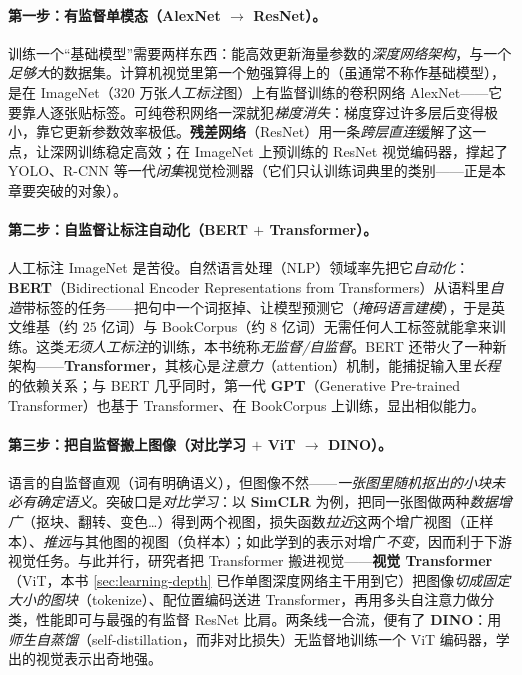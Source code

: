 \paragraph{第一步：有监督单模态（AlexNet $\to$ ResNet）。}
训练一个“基础模型”需要两样东西：能高效更新海量参数的\emph{深度网络架构}，与一个\emph{足够大}的数据集。计算机视觉里第一个勉强算得上的（虽通常不称作基础模型），是在 ImageNet（$320$ 万张\emph{人工标注}图）上有监督训练的卷积网络 AlexNet——它要靠人逐张贴标签。可纯卷积网络一深就犯\emph{梯度消失}：梯度穿过许多层后变得极小，靠它更新参数效率极低。\textbf{残差网络}（ResNet）\cite{he2016resnet}用一条\emph{跨层直连}缓解了这一点，让深网训练稳定高效；在 ImageNet 上预训练的 ResNet 视觉编码器，撑起了 YOLO、R-CNN 等一代\emph{闭集}视觉检测器（它们只认训练词典里的类别——正是本章要突破的对象）。

\paragraph{第二步：自监督让标注自动化（BERT $+$ Transformer）。}
人工标注 ImageNet 是苦役。自然语言处理（NLP）领域率先把它\emph{自动化}：\textbf{BERT}（Bidirectional Encoder Representations from Transformers）从语料里\emph{自造}带标签的任务——把句中一个词抠掉、让模型预测它（\emph{掩码语言建模}），于是英文维基（约 $25$ 亿词）与 BookCorpus（约 $8$ 亿词）无需任何人工标签就能拿来训练。这类\emph{无须人工标注}的训练，本书统称\emph{无监督/自监督}。BERT 还带火了一种新架构——\textbf{Transformer}，其核心是\emph{注意力}（attention）机制，能捕捉输入里\emph{长程}的依赖关系；与 BERT 几乎同时，第一代 \textbf{GPT}（Generative Pre-trained Transformer）也基于 Transformer、在 BookCorpus 上训练，显出相似能力。

\paragraph{第三步：把自监督搬上图像（对比学习 $+$ ViT $\to$ DINO）。}
语言的自监督直观（词有明确语义），但图像不然——\emph{一张图里随机抠出的小块未必有确定语义}。突破口是\emph{对比学习}：以 \textbf{SimCLR} 为例，把同一张图做两种\emph{数据增广}（抠块、翻转、变色\dots）得到两个视图，损失函数\emph{拉近}这两个增广视图（正样本）、\emph{推远}与其他图的视图（负样本）；如此学到的表示对增广\emph{不变}，因而利于下游视觉任务。与此并行，研究者把 Transformer 搬进视觉——\textbf{视觉 Transformer}（ViT，本书 \cref{sec:learning-depth} 已作单图深度网络主干用到它）把图像\emph{切成固定大小的图块}（tokenize）、配位置编码送进 Transformer，再用多头自注意力做分类，性能即可与最强的有监督 ResNet 比肩。两条线一合流，便有了 \textbf{DINO}\cite{caron2021dino}：用\emph{师生自蒸馏}（self-distillation，而非对比损失）无监督地训练一个 ViT 编码器，学出的视觉表示出奇地强。

